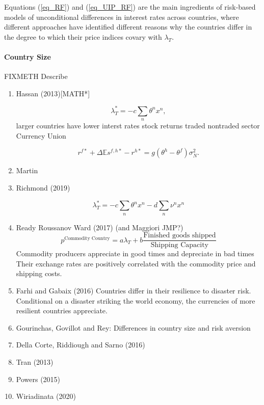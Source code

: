 \documentclass{ar-1col}
\begin{document}
Equations (\ref{eq_RF}) and (\ref{eq_UIP_RF}) are the main ingredients
of risk-based models of unconditional differences in interest rates
across countries, where different approaches have identified different
reasons why the countries differ in the degree to which their price
indices covary with $\lambda_T$.

\paragraph*{Country Size}




FIXMETH Describe
\begin{enumerate}
\item Hassan (2013)[MATH*]

  \begin{equation} \lambda_{T}^\ast = -c \sum_{n} \theta^n x^n,
    \label{eqn:lambdat2NP}
  \end{equation}
  larger countries have lower interst rates stock returns traded
  nontraded sector Currency Union

\begin{equation}
  r^{f \ast} + \Delta \mathbb{E} s^{f, h \ast} - r^{h \ast}
  =g\left(\theta^h - \theta^f\right) \sigma_N^2.
  \label{eq_FF_UIP}
\end{equation}
\item Martin
\item Richmond (2019)

$$\lambda_{T}^\ast = -c
\sum_{n} \theta^n x^n- d\sum_{n} \nu^n x^n$$



\item Ready Roussanov Ward (2017) (and Maggiori JMP?)
$$p^{\text{Commodity Country}}=a\lambda_T+b\frac{\text{Finished goods shipped}}{\text{Shipping Capacity}} $$
Commodity producers appreciate in good times and depreciate in bad
times Their exchange rates are positively correlated with the
commodity price and shipping costs.
\item Farhi and Gabaix (2016) Countries differ in their resilience to
  disaster risk. Conditional on a disaster striking the world economy,
  the currencies of more resilient countries appreciate.
\item Gourinchas, Govillot and Rey: Differences in country size and
  risk aversion
\item Della Corte, Riddiough and Sarno (2016)
\item Tran (2013)
\item Powers (2015)
\item Wiriadinata (2020)
\end{enumerate}
\end{document}
